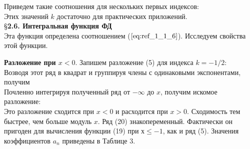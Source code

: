 Приведем такие соотношения для нескольких первых индексов:
\begin{equation}
\label{eq:ref_2_5_4}
\end{equation}
Этих значений $k$ достаточно для практических приложений.
\\

\S \textbf{2.6. Интегральная функция ФД}
\\

Эта функция определена соотношением ($\ref{eq:ref_1_1_6}$). Исследуем свойства этой функции.

\textbf{Разложение при $x < 0.$} Запишем разложение (5) для индекса $k=-1/2$:
\begin{equation}
\label{eq:ref_2_6_1}
\end{equation}
Возводя этот ряд в квадрат и группируя члены с одинаковыми экспонентами, получим
\begin{equation}
\label{eq:ref_2_6_2}
\end{equation}
Почленно интегрируя полученный ряд от $-\infty$ до $x$, получим искомое
разложение:
\begin{equation}
\label{eq:ref_2_6_3}
\end{equation}
Это разложение сходится при $x < 0$ и расходится при $x > 0$. Сходимость тем
быстрее, чем больше модуль $x$. Ряд (20) знакопеременный. Фактически он
пригоден для вычисления функции (19) при $х \leqslant -1$, как и ряд (5). Значения
коэффициентов $a_n$ приведены в Таблице 3.

